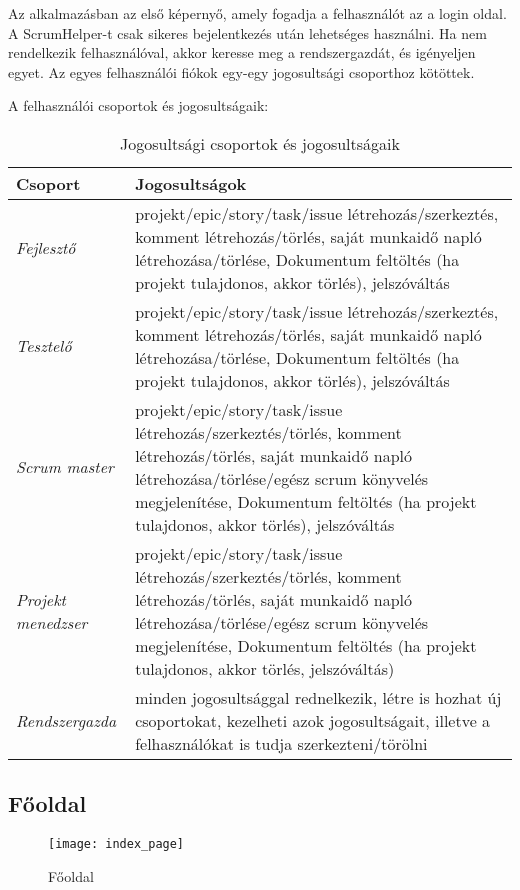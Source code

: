 Az alkalmazásban az első képernyő, amely fogadja a felhasználót az a login oldal. A ScrumHelper-t csak sikeres bejelentkezés után lehetséges használni. Ha nem rendelkezik felhasználóval, akkor keresse meg a rendszergazdát, és igényeljen egyet. Az egyes felhasználói fiókok egy-egy jogosultsági csoporthoz kötöttek. 

A felhasználói csoportok és jogosultságaik:

\begin{table}[H]
	\centering
	\begin{tabular}{ | m{} | m{} | }
		\hline
		\textbf{Csoport} & \textbf{Jogosultságok} \\
		\hline \hline
		\emph{Fejlesztő} & projekt/epic/story/task/issue létrehozás/szerkeztés, komment létrehozás/törlés, saját munkaidő napló létrehozása/törlése, Dokumentum feltöltés (ha projekt tulajdonos, akkor törlés), jelszóváltás \\
		\hline
		\emph{Tesztelő} &   projekt/epic/story/task/issue létrehozás/szerkeztés, komment létrehozás/törlés, saját munkaidő napló létrehozása/törlése, Dokumentum feltöltés (ha projekt tulajdonos, akkor törlés), jelszóváltás \\
		\hline
		\emph{Scrum master} & projekt/epic/story/task/issue létrehozás/szerkeztés/törlés, komment létrehozás/törlés, saját munkaidő napló létrehozása/törlése/egész scrum könyvelés megjelenítése, Dokumentum feltöltés (ha projekt tulajdonos, akkor törlés), jelszóváltás \\
		\hline
		\emph{Projekt menedzser} & projekt/epic/story/task/issue létrehozás/szerkeztés/törlés, komment létrehozás/törlés, saját munkaidő napló létrehozása/törlése/egész scrum könyvelés megjelenítése, Dokumentum feltöltés (ha projekt tulajdonos, akkor törlés, jelszóváltás) \\
		\hline
		\emph{Rendszergazda} & minden jogosultsággal rednelkezik, létre is hozhat új csoportokat, kezelheti azok jogosultságait, illetve a felhasználókat is tudja szerkezteni/törölni \\
		\hline
	\end{tabular}
	\caption{Jogosultsági csoportok és jogosultságaik}
	\label{tab:example-1}
\end{table}

\subsection{Főoldal}

\begin{figure}[H]
	\centering
	\texttt{[image: index\_page]}
	\caption{Főoldal}
	\label{fig:example-1}
\end{figure}

